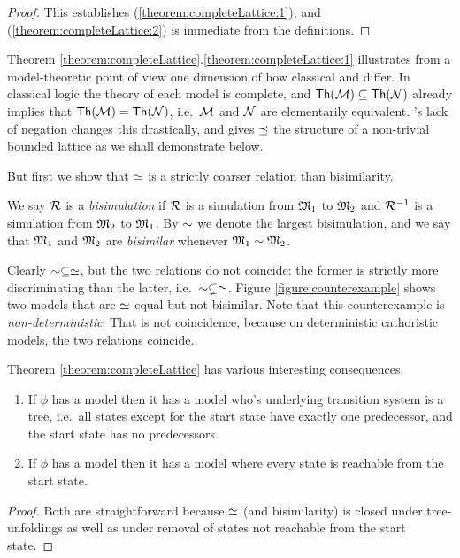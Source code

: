 \begin{proof}
This establishes (\ref{theorem:completeLattice:1}), and
(\ref{theorem:completeLattice:2}) is immediate from the definitions.


\end{proof}

\NI Theorem
\ref{theorem:completeLattice}.\ref{theorem:completeLattice:1}
illustrates from a model-theoretic point of view one dimension of how
classical and \cathoristic{} differ. In classical logic the theory of
each model is complete, and $\mathsf{Th}(\mathcal{M}) \subseteq
\mathsf{Th}(\mathcal{N})$ already implies that $\mathsf{Th}(\mathcal{M}) =
\mathsf{Th}(\mathcal{N})$, i.e.~$\mathcal{M}$ and $\mathcal{N}$ are elementarily
equivalent. \Cathoristic{}'s lack of negation changes this drastically, and
gives $\preceq$ the structure of a non-trivial bounded lattice as we
shall demonstrate below.

But first we show that $\simeq$ is a strictly coarser relation than 
bisimilarity.

\begin{definition}
We say $\mathcal{R}$ is a \emph{bisimulation} if $\mathcal{R}$ is a simulation from
$\frak{M}_1$ to $\frak{M}_2$ and $\mathcal{R}^{-1}$ is a simulation from $\frak{M}_2$ to
$\frak{M}_1$. By $\sim$ we denote the largest bisimulation, and we say
that $\frak{M}_1$ and $\frak{M}_2$ are \emph{bisimilar} whenever $\frak{M}_1
\sim \frak{M}_2$.
\end{definition}

Clearly $\sim \subseteq \simeq$, but the two relations do not
coincide: the former is strictly more discriminating than the latter,
i.e.~$\sim \subsetneq \simeq$. Figure \ref{figure:counterexample}
shows two models that are $\simeq$-equal but not bisimilar. Note
that this counterexample is \emph{non-deterministic}. That is not
coincidence, because on deterministic cathoristic models, the two relations
coincide.



Theorem \ref{theorem:completeLattice} has various interesting
consequences.

\begin{corollary}
\begin{enumerate}

\item If $\phi$ has a model then it has a model who's underlying
  transition system is a tree, i.e.~all states except for the start state
  have exactly one predecessor, and the start state has no predecessors.

\item If $\phi$ has a model then it has a model where every state is
  reachable from the start state.

\end{enumerate}
\end{corollary}
\begin{proof}
Both are straightforward because $\simeq$ (and bisimilarity) is
closed under tree-unfoldings as well as under removal of states not
reachable from the start state.
\end{proof}


